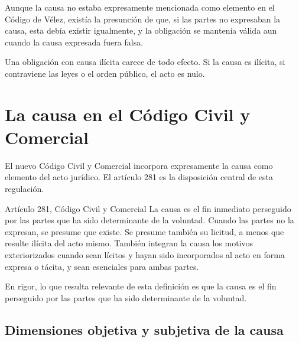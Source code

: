 \documentclass[12pt,oneside]{book}
\begin{document}
Aunque la causa no estaba expresamente mencionada como elemento en el Código de Vélez, existía la presunción de que, si las partes no expresaban la causa, esta debía existir igualmente, y la obligación se mantenía válida aun cuando la causa expresada fuera falsa.

\begin{important}
Una obligación con causa ilícita carece de todo efecto. Si la causa es ilícita, si contraviene las leyes o el orden público, el acto es nulo.
\end{important}


\section{La causa en el Código Civil y Comercial}

El nuevo Código Civil y Comercial incorpora expresamente la causa como elemento del acto jurídico. El artículo 281 es la disposición central de esta regulación.

\begin{definition}{Artículo 281, Código Civil y Comercial}
La causa es el fin inmediato perseguido por las partes que ha sido determinante de la voluntad. Cuando las partes no la expresan, se presume que existe. Se presume también su licitud, a menos que resulte ilícita del acto mismo. También integran la causa los motivos exteriorizados cuando sean lícitos y hayan sido incorporados al acto en forma expresa o tácita, y sean esenciales para ambas partes.
\end{definition}

En rigor, lo que resulta relevante de esta definición es que la causa es el fin perseguido por las partes que ha sido determinante de la voluntad.

\subsection{Dimensiones objetiva y subjetiva de la causa}
\end{document}
